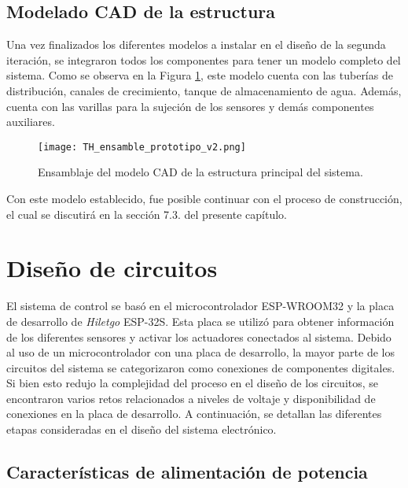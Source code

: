 \subsection{Modelado CAD de la estructura}

Una vez finalizados los diferentes modelos a instalar en el diseño de la segunda iteración, se integraron todos los componentes para tener un modelo completo del sistema. Como se observa en la Figura \ref{fig:estanteria_v2}, este modelo cuenta con las tuberías de distribución, canales de crecimiento, tanque de almacenamiento de agua. Además, cuenta con las varillas para la sujeción de los sensores y demás componentes auxiliares.

\begin{figure}[H]
	\centering
	\texttt{[image: TH\_ensamble\_prototipo\_v2.png]}
	\caption{Ensamblaje del modelo CAD de la estructura principal del sistema.}
	\label{fig:estanteria_v2}
\end{figure}

Con este modelo establecido, fue posible continuar con el proceso de construcción, el cual se discutirá en la sección 7.3. del presente capítulo.

\section{Diseño de circuitos}

El sistema de control se basó en el microcontrolador ESP-WROOM32 y la placa de desarrollo de \textit{Hiletgo} ESP-32S. Esta placa se utilizó para obtener información de los diferentes sensores y activar los actuadores conectados al sistema. Debido al uso de un microcontrolador con una placa de desarrollo, la mayor parte de los circuitos del sistema se categorizaron como conexiones de componentes digitales. Si bien esto redujo la complejidad del proceso en el diseño de los circuitos, se encontraron varios retos relacionados a niveles de voltaje y disponibilidad de conexiones en la placa de desarrollo. A continuación, se detallan las diferentes etapas consideradas en el diseño del sistema electrónico.

\subsection{Características de alimentación de potencia}

